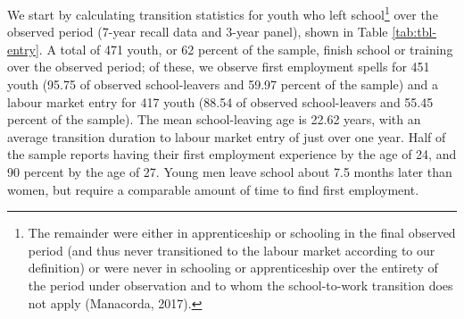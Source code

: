 \documentclass[
  a4paper, twoside, 12pt]{book}
\begin{document}
We start by calculating transition statistics for youth who left school\footnote{The remainder were either in apprenticeship or schooling in the final observed period (and thus never transitioned to the labour market according to our definition) or were never in schooling or apprenticeship over the entirety of the period under observation and to whom the school-to-work transition does not apply (Manacorda, 2017).} over the observed period (7-year recall data and 3-year panel), shown in Table \ref{tab:tbl-entry}. A total of 471 youth, or 62 percent of the sample, finish school or training over the observed period; of these, we observe first employment spells for 451 youth (95.75 of observed school-leavers and 59.97 percent of the sample) and a labour market entry for 417 youth (88.54 of observed school-leavers and 55.45 percent of the sample). The mean school-leaving age is 22.62 years, with an average transition duration to labour market entry of just over one year. Half of the sample reports having their first employment experience by the age of 24, and 90 percent by the age of 27. Young men leave school about 7.5 months later than women, but require a comparable amount of time to find first employment.
\end{document}
